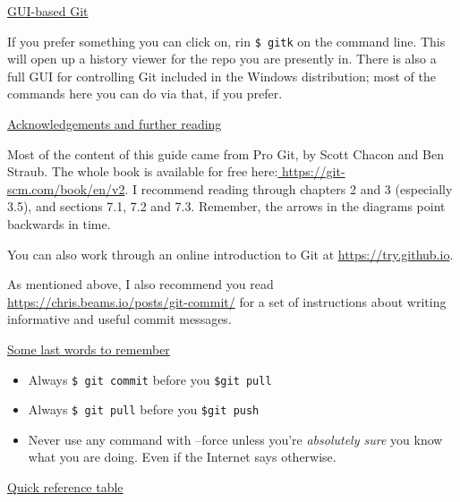 \documentclass[11pt, a4paper, english]{article}
\begin{document}
\underline{GUI-based Git}

If you prefer something you can click on, rin \verb|$ gitk| on the command line. This will open up a history viewer for the repo you are presently in. There is also a full GUI for controlling Git included in the Windows distribution; most of the commands here you can do via that, if you prefer.

\underline{Acknowledgements and further reading}

Most of the content of this guide came from Pro Git, by Scott Chacon and Ben Straub. The whole book is available for free here:\url{ https://git-scm.com/book/en/v2}. I recommend reading through chapters 2 and 3 (especially 3.5), and sections 7.1, 7.2 and 7.3. Remember, the arrows in the diagrams point backwards in time.

You can also work through an online introduction to Git at \url{https://try.github.io}.

As mentioned above, I also recommend you read \url{https://chris.beams.io/posts/git-commit/} for a set of instructions about writing informative and useful commit messages.

\underline{Some last words to remember}

\begin{itemize}
\item Always \verb|$ git commit| before you \verb|$git pull|
\item Always \verb|$ git pull| before you \verb|$git push|
\item Never use any command with --force unless you’re \textit{absolutely sure} you know what you are doing. Even if the Internet says otherwise.
\end{itemize}

\underline{Quick reference table}
\end{document}
